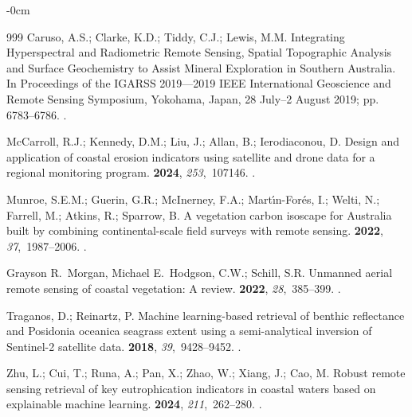 \documentclass[jmse,article,accept,pdftex,oneauthor]{Definitions/mdpi}
\begin{document}
\begin{adjustwidth}{-\extralength}{0cm}
\begin{thebibliography}{999}
Caruso, A.S.; Clarke, K.D.; Tiddy, C.J.; Lewis, M.M.
\newblock Integrating Hyperspectral and Radiometric Remote Sensing, Spatial
  Topographic Analysis and Surface Geochemistry to Assist Mineral Exploration
  in Southern Australia.
\newblock In Proceedings of the IGARSS 2019---2019 IEEE International
  Geoscience and Remote Sensing Symposium, Yokohama, Japan, 28 July--2 August 2019; pp. 6783--6786.
.

McCarroll, R.J.; Kennedy, D.M.; Liu, J.; Allan, B.; Ierodiaconou, D.
\newblock Design and application of coastal erosion indicators using satellite
  and drone data for a regional monitoring program.
 {\bf 2024}, {\em 253},~107146.
.

Munroe, S.E.M.; Guerin, G.R.; McInerney, F.A.; Mart{\'\i}n-For{\'e}s, I.;
  Welti, N.; Farrell, M.; Atkins, R.; Sparrow, B.
\newblock A vegetation carbon isoscape for Australia built by combining
  continental-scale field surveys with remote sensing.
 {\bf 2022}, {\em 37},~1987--2006.
.

Grayson R.~Morgan, Michael E.~Hodgson, C.W.; Schill, S.R.
\newblock Unmanned aerial remote sensing of coastal vegetation: A review.
 {\bf 2022}, {\em 28},~385--399.
.

Traganos, D.; Reinartz, P.
\newblock Machine learning-based retrieval of benthic reflectance and Posidonia
  oceanica seagrass extent using a semi-analytical inversion of Sentinel-2
  satellite data.
 {\bf 2018}, {\em
  39},~9428--9452.
.

Zhu, L.; Cui, T.; Runa, A.; Pan, X.; Zhao, W.; Xiang, J.; Cao, M.
\newblock Robust remote sensing retrieval of key eutrophication indicators in
  coastal waters based on explainable machine learning.
 {\bf 2024},
  {\em 211},~262--280.
.


\end{thebibliography}
\end{adjustwidth}
\end{document}
